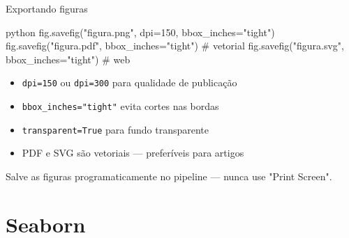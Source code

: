 \documentclass[xcolor=dvipsnames,t,aspectratio=169]{beamer}
\newcommand{\highlight}[1]{{\color{nes_dark_orange} #1}}
\begin{document}
\begin{frame}[c, fragile]{Exportando figuras}

\begin{code}{python}
fig.savefig("figura.png", dpi=150, bbox_inches="tight")
fig.savefig("figura.pdf", bbox_inches="tight")   # vetorial
fig.savefig("figura.svg", bbox_inches="tight")   # web
\end{code}

\begin{itemize}
    \item \texttt{dpi=150} ou \texttt{dpi=300} para qualidade de publicação
    \item \texttt{bbox\_inches="tight"} evita cortes nas bordas
    \item \texttt{transparent=True} para fundo transparente
    \item PDF e SVG são \highlight{vetoriais} — preferíveis para artigos
\end{itemize}

\begin{display}
Salve as figuras programaticamente no pipeline — nunca use "Print Screen".
\end{display}

\end{frame}


\section{Seaborn}
\end{document}
